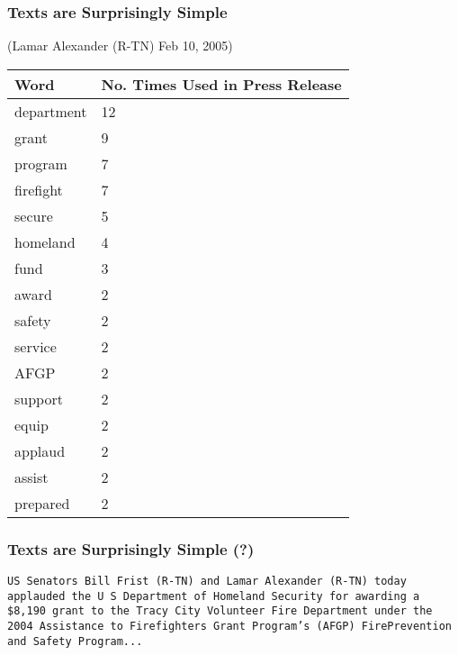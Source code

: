 \documentclass{beamer}
\begin{document}
\begin{frame}
\frametitle{Texts are Surprisingly Simple}

(Lamar Alexander (R-TN) Feb 10, 2005)
\begin{table}
\begin{tabular}{ll}
\hline
 Word & No. Times Used in Press Release \\
 \hline
 department &     12\\
  grant  &      9 \\
  program &   7 \\
  firefight &  7 \\
  secure  &    5 \\
  homeland  &  4 \\
  fund   &    3 \\
 award  &    2 \\
 safety  &     2 \\
 service &    2 \\
 AFGP   &    2 \\
 support &   2 \\
equip  &    2 \\
applaud  &  2\\ 
 assist  &   2\\ 
prepared &  2 \\
\hline  
\end{tabular}
\end{table}



\end{frame}




\begin{frame}
\frametitle{Texts are Surprisingly Simple (?)}

{\tt US  Senators Bill Frist  (R-TN)  and Lamar Alexander (R-TN) today applauded the U S  Department of Homeland Security for awarding a \$8,190 grant to the Tracy City Volunteer Fire Department under the 2004 Assistance to Firefighters Grant Program's  (\alert{AFGP})  FirePrevention and Safety Program...}


\end{frame}
\end{document}
